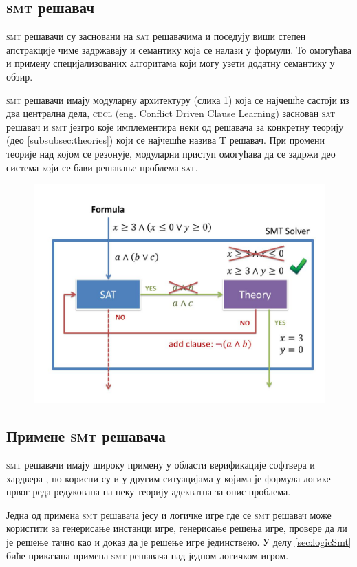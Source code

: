 \documentclass[a4paper]{article}
\begin{document}
\subsection{\textsc{smt} решавач}
\textsc{smt} решавачи су засновани на \textsc{sat} решавачима и поседују виши степен апстракције чиме задржавају и семантику која се
налази у формули. То омогућава и примену специјализованих алгоритама који могу узети додатну семантику у обзир.

\textsc{smt} решавачи имају модуларну архитектуру (слика \ref{fig:smtarch}) која се најчешће састоји из два централна дела,
\textsc{cdcl} (eng. Conflict Driven Clause Learning) заснован \textsc{sat} решавач \cite{satcdcl1, satcdcl2, satcdcl3} и \textsc{smt} језгро
које имплементира неки од решавача за конкретну теорију (део \ref{subsubsec:theories}) који се најчешће назива \textsc{T} решавач.
При промени теорије над којом се резонује, модуларни приступ
омогућава да се задржи део система који се бави решавање проблема \textsc{sat}.

\begin{figure}
    \centering
    \includegraphics[width=.7\linewidth]{./slike/arch.jpg}
    \label{fig:smtarch}
\end{figure}

\subsection{Примене \textsc{smt} решавача}
\textsc{smt} решавачи имају широку примену у области верификације софтвера и хардвера \cite{smtexample1, smtexample2, smtexample3, smtexample4},
но корисни су и у другим ситуацијама у којима је формула логике првог реда редукована на неку теорију адекватна за опис проблема.


Једна од примена \textsc{smt} решавача јесу и логичке игре где се \textsc{smt} решавач може користити за генерисање инстанци игре,
генерисање решења игре, провере да ли је решење тачно као и доказ да је решење игре јединствено. У делу
\ref{sec:logicSmt} биће приказана примена \textsc{smt} решавача над једном логичком игром.
\end{document}
